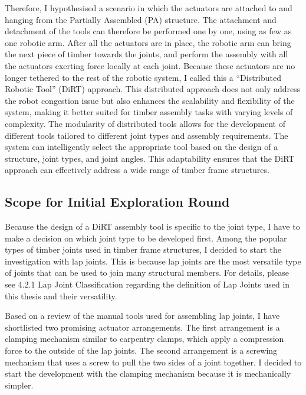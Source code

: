 Therefore, I hypothesised a scenario in which the actuators are attached to and hanging from the Partially Assembled (PA) structure. The attachment and detachment of the tools can therefore be performed one by one, using as few as one robotic arm. After all the actuators are in place, the robotic arm can bring the next piece of timber towards the joints, and perform the assembly with all the actuators exerting force locally at each joint. Because these actuators are no longer tethered to the rest of the robotic system, I called this a “Distributed Robotic Tool” (DiRT) approach. 
This distributed approach does not only address the robot congestion issue but also enhances the scalability and flexibility of the system, making it better suited for timber assembly tasks with varying levels of complexity. The modularity of distributed tools allows for the development of different tools tailored to different joint types and assembly requirements. The system can intelligently select the appropriate tool based on the design of a structure, joint types, and joint angles. This adaptability ensures that the DiRT approach can effectively address a wide range of timber frame structures.

\subsection{Scope for Initial Exploration Round}
\label{subsection:exploration-1-scope-for-initial-exploration-round}

Because the design of a DiRT assembly tool is specific to the joint type, I have to make a decision on which joint type to be developed first. Among the popular types of timber joints used in timber frame structures, I decided to start the investigation with lap joints. This is because lap joints are the most versatile type of joints that can be used to join many structural members. For details, please see 4.2.1 Lap Joint Classification regarding the definition of Lap Joints used in this thesis and their versatility.

Based on a review of the manual tools used for assembling lap joints, I have shortlisted two promising actuator arrangements. The first arrangement is a clamping mechanism similar to carpentry clamps, which apply a compression force to the outside of the lap joints. The second arrangement is a screwing mechanism that uses a screw to pull the two sides of a joint together. I decided to start the development with the clamping mechanism because it is mechanically simpler. 

